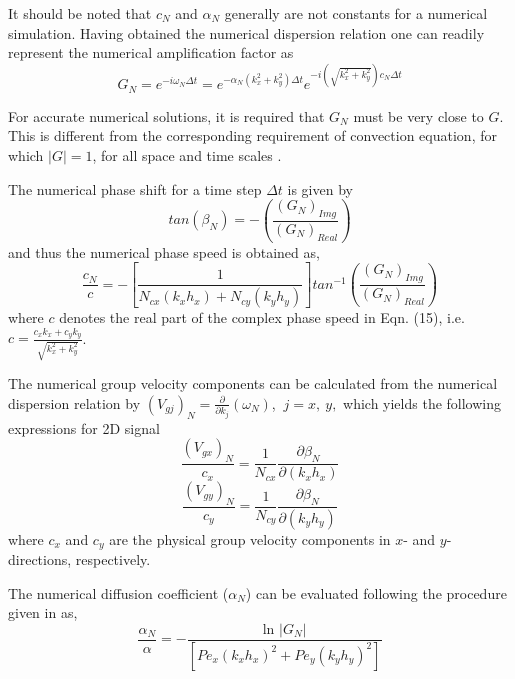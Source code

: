 \documentclass[showpacs,preprintnumbers,amsmath,amssymb]{revtex4-1} %
\begin{document}
It should be noted that $c_N$ and $\alpha_N$ generally are not constants for a numerical simulation. Having obtained the numerical dispersion relation one can readily represent the numerical amplification factor as
\begin{equation}
G_N=e^{-i\omega_N\Delta t} =e^{-\alpha_N(k_x^2+k_y^2)\Delta t}e^{-i(\sqrt{k_x^2+k_y^2})c_N\Delta t}
\end{equation}

For accurate numerical solutions, it is required that $G_N$ must be very close to $G$. This is different from the corresponding requirement of convection equation, for which $|G|=1$, for all space and time scales \cite{SENGUPTA_et_al_2}.

The numerical phase shift for a time step $\Delta t$ is given by
\begin{equation}
tan(\beta_N)=-\left(\frac{(G_N)_{Img}}{(G_N)_{Real}}\right)
\end{equation}
and thus the numerical phase speed is obtained as,
\begin{equation}
\frac{c_N}{c}=-\left[\frac{1}{N_{cx}(k_xh_x)+N_{cy}(k_yh_y)}\right]tan^{-1}\left(\frac{(G_N)_{Img}}{(G_N)_{Real}}\right)
\end{equation}
where $c$ denotes the real part of the complex phase speed in Eqn. (15), i.e. $c=\frac{c_xk_x+c_yk_y}{\sqrt{k_x^2+k_y^2}}$.

The numerical group velocity components can be calculated from the numerical dispersion relation by $(V_{gj})_N=\frac{\partial}{\partial k_j}(\omega_N)$, $\ j=x,\ y,$ which yields the following expressions for 2D signal
\begin{equation}
\frac{(V_{gx})_N}{c_x}=\frac{1}{N_{cx}} \frac{\partial \beta_N}{\partial (k_xh_x)}
\end{equation}
\begin{equation}
\frac{(V_{gy})_N}{c_y}=\frac{1}{N_{cy}} \frac{\partial \beta_N}{\partial (k_yh_y)}
\end{equation}
where $c_x$ and $c_y$ are the physical group velocity components in $x$- and $y$-directions, respectively.

The numerical diffusion coefficient ($\alpha_N$) can be evaluated following the procedure given in \cite{SUMAN_et_al,pirozzoli2019} as,  
\begin{equation}
\frac{\alpha_N}{\alpha}=-\frac{\text{ln }|G_N|}{[Pe_x(k_xh_x)^2+Pe_y(k_yh_y)^2]}
\end{equation}
\end{document}
